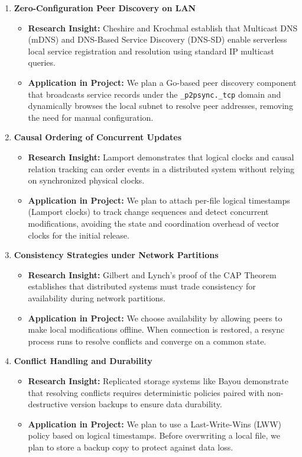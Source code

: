 \documentclass[11pt,oneside]{article}
\begin{document}
\begin{enumerate}
    \item \textbf{Zero-Configuration Peer Discovery on LAN}
    \begin{itemize}
        \item \textbf{Research Insight:} Cheshire and Krochmal \cite{rfc6762, rfc6763} establish that Multicast DNS (mDNS) and DNS-Based Service Discovery (DNS-SD) enable serverless local service registration and resolution using standard IP multicast queries.
        \item \textbf{Application in Project:} We plan a Go-based peer discovery component that broadcasts service records under the \texttt{\_p2psync.\_tcp} domain and dynamically browses the local subnet to resolve peer addresses, removing the need for manual configuration.
    \end{itemize}

    \item \textbf{Causal Ordering of Concurrent Updates}
    \begin{itemize}
        \item \textbf{Research Insight:} Lamport \cite{lamport1978} demonstrates that logical clocks and causal relation tracking can order events in a distributed system without relying on synchronized physical clocks.
        \item \textbf{Application in Project:} We plan to attach per-file logical timestamps (Lamport clocks) to track change sequences and detect concurrent modifications, avoiding the state and coordination overhead of vector clocks for the initial release.
    \end{itemize}

    \item \textbf{Consistency Strategies under Network Partitions}
    \begin{itemize}
        \item \textbf{Research Insight:} Gilbert and Lynch's proof of the CAP Theorem \cite{brewer2002} establishes that distributed systems must trade consistency for availability during network partitions.
        \item \textbf{Application in Project:} We choose availability by allowing peers to make local modifications offline. When connection is restored, a resync process runs to resolve conflicts and converge on a common state.
    \end{itemize}

    \item \textbf{Conflict Handling and Durability}
    \begin{itemize}
        \item \textbf{Research Insight:} Replicated storage systems like Bayou \cite{bayou1995} demonstrate that resolving conflicts requires deterministic policies paired with non-destructive version backups to ensure data durability.
        \item \textbf{Application in Project:} We plan to use a Last-Write-Wins (LWW) policy based on logical timestamps. Before overwriting a local file, we plan to store a backup copy to protect against data loss.
    \end{itemize}


\end{enumerate}
\end{document}
